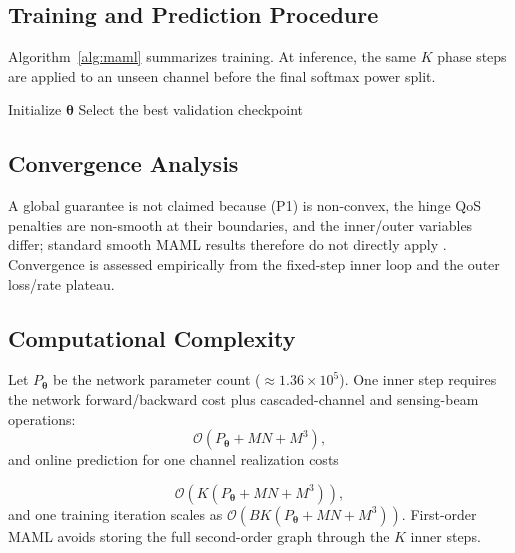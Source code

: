 \documentclass[10pt,journal]{IEEEtran}
\begin{document}
\subsection{Training and Prediction Procedure}
Algorithm~\ref{alg:maml} summarizes training. At inference, the same $K$ phase
steps are applied to an unseen channel before the final softmax power split.

\begin{algorithm}[t]
\scriptsize
\SetAlgoLined
\DontPrintSemicolon
{}
Initialize $\bm\theta$\;
Select the best validation checkpoint\;
\caption{First-order MAML-based power and RIS-phase optimization}
\label{alg:maml}
\end{algorithm}

\subsection{Convergence Analysis}
A global guarantee is not claimed because (P1) is non-convex, the hinge QoS
penalties are non-smooth at their boundaries, and the inner/outer variables
differ; standard smooth MAML results therefore do not directly apply
\cite{zou2023ml,fallah2020maml,ji2022maml}. Convergence is assessed empirically
from the fixed-step inner loop and the outer loss/rate plateau.

\subsection{Computational Complexity}
Let $P_{\bm\theta}$ be the network parameter count
($\approx1.36\times10^5$). One inner step requires the network forward/backward
cost plus cascaded-channel and sensing-beam operations:
\begin{equation}
\mathcal O\!\left(P_{\bm\theta}+MN+M^3\right),
\end{equation}
and online prediction for one channel realization costs

\begin{equation}
\mathcal O\!\left(K(P_{\bm\theta}+MN+M^3)\right), \label{eq:onlinecomplex}
\end{equation}
and one training iteration scales as
$\mathcal O(BK(P_{\bm\theta}+MN+M^3))$. First-order MAML avoids storing the
full second-order graph through the $K$ inner steps.
\end{document}
